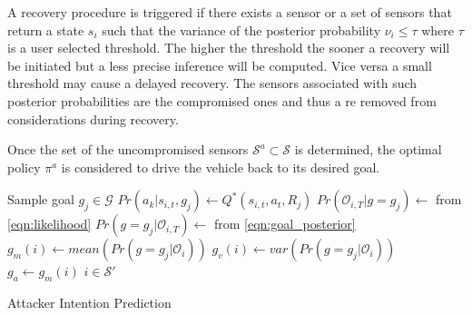 \documentclass[letterpaper, 10 pt, conference]{ieeeconf}  %
\begin{document}
A recovery procedure is triggered if there exists a sensor or a set of sensors that return a state $s_i$ such that the variance of the posterior probability $\nu_i \leq \tau$ where $\tau$ is a user selected threshold. The higher the threshold the sooner a recovery will be initiated but a less precise inference will be computed. Vice versa a small threshold may cause a delayed recovery. The sensors associated with such posterior probabilities are the compromised ones and thus a re removed from considerations during recovery.


Once the set of the uncompromised sensors $\mathcal S^a \subset \mathcal S$ is determined, the optimal policy $\pi^a$ is considered to drive the vehicle back to its desired goal.

\begin{algorithm}\label{alg:alg1}
    {
        {
            Sample goal $g_j \in \mathcal{G}$\;
            { 
                $Pr(a_k|s_{i,t},g_j) \leftarrow Q^*(s_{i,t},a_t,R_j)$\;
            }
            $Pr(\mathcal{O}_{i,T}|g=g_j) \leftarrow$  from \ref{eqn:likelihood}\;
            $Pr(g=g_j|\mathcal{O}_{i,T}) \leftarrow$ from \ref{eqn:goal_posterior}\;
        }
        $g_m(i) \leftarrow mean(Pr(g=g_j|\mathcal{O}_i))$\;
        $g_v(i) \leftarrow  var(Pr(g=g_j|\mathcal{O}_i))$\;
        {
            $g_a \leftarrow g_m(i)$\;
            $i \in \mathcal{S}'$\;
        }
    }
    \caption{Attacker Intention Prediction}
\end{algorithm}
\end{document}

